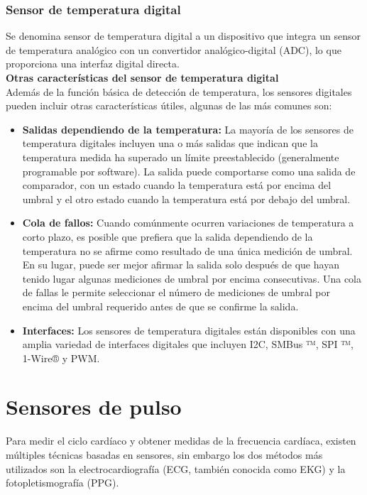 		\subsubsection{Sensor de temperatura digital}
		Se denomina sensor de temperatura digital a un dispositivo que integra un sensor de temperatura analógico con un convertidor analógico-digital (ADC), lo que proporciona una interfaz digital directa. \cite{maximThermal} \\
				
	    \textbf{Otras características del sensor de temperatura digital}\\
	    Además de la función básica de detección de temperatura, los sensores digitales pueden incluir otras características útiles, algunas de las más comunes son:
	    \begin{itemize}
	    	\item \textbf{Salidas dependiendo de la temperatura:} La mayoría de los sensores de temperatura digitales incluyen una o más salidas que indican que la temperatura medida ha superado un límite preestablecido (generalmente programable por software). La salida puede comportarse como una salida de comparador, con un estado cuando la temperatura está por encima del umbral y el otro estado cuando la temperatura está por debajo del umbral.
	    	
	    	\item \textbf{Cola de fallos:} Cuando comúnmente ocurren variaciones de temperatura a corto plazo, es posible que prefiera que la salida dependiendo de la temperatura no se afirme como resultado de una única medición de umbral. En su lugar, puede ser mejor afirmar la salida solo después de que hayan tenido lugar algunas mediciones de umbral por encima consecutivas. Una cola de fallas le permite seleccionar el número de mediciones de umbral por encima del umbral requerido antes de que se confirme la salida.
	    	
	    	\item \textbf{Interfaces:} Los sensores de temperatura digitales están disponibles con una amplia variedad de interfaces digitales que incluyen I2C, SMBus ™, SPI ™, 1-Wire® y PWM.
	    \end{itemize}
	
	\section{Sensores de pulso}
	
	Para medir el ciclo cardíaco y obtener medidas de la frecuencia cardíaca, existen múltiples técnicas basadas en sensores, sin embargo los dos métodos más utilizados son la electrocardiografía (ECG, también conocida como EKG) y la fotopletismografía (PPG). \cite{soenh2017} \\
	
